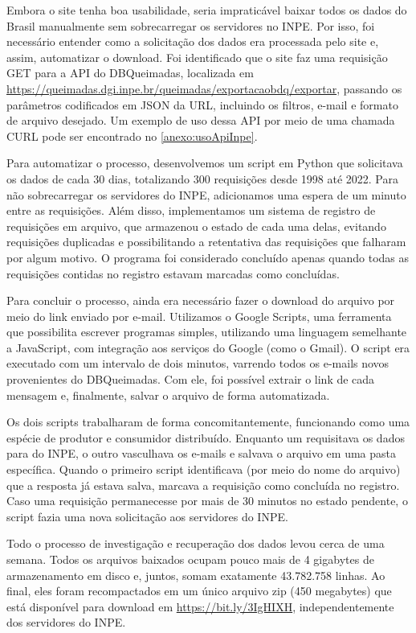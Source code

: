 \documentclass[cic,tc]{iiufrgs}
\begin{document}
Embora o site tenha boa usabilidade, seria impraticável baixar todos os dados do Brasil manualmente sem sobrecarregar os servidores no INPE. Por isso, foi necessário entender como a solicitação dos dados era processada pelo site e, assim, automatizar o download. Foi identificado que o site faz uma requisição GET para a API do DBQueimadas, localizada em \url{https://queimadas.dgi.inpe.br/queimadas/exportacaobdq/exportar}, passando os parâmetros  codificados em JSON da URL, incluindo os filtros, e-mail e formato de arquivo desejado. Um exemplo de uso dessa API por meio de uma chamada CURL pode ser encontrado no \ref{anexo:usoApiInpe}.

Para automatizar o processo, desenvolvemos um script em Python que solicitava os dados de cada 30 dias, totalizando 300 requisições desde 1998 até 2022. Para não sobrecarregar os servidores do INPE, adicionamos uma espera de um minuto entre as requisições. Além disso, implementamos um sistema de registro de requisições em arquivo, que armazenou o estado de cada uma delas, evitando requisições duplicadas e possibilitando a retentativa das requisições que falharam por algum motivo. O programa foi considerado concluído apenas quando todas as requisições contidas no registro estavam marcadas como concluídas.

Para concluir o processo, ainda era necessário fazer o download do arquivo por meio do link enviado por e-mail. Utilizamos o Google Scripts, uma ferramenta que possibilita escrever programas simples, utilizando uma linguagem semelhante a JavaScript, com integração aos serviços do Google (como o Gmail). O script era executado com um intervalo de dois minutos, varrendo todos os e-mails novos provenientes do DBQueimadas. Com ele, foi possível extrair o link de cada mensagem e, finalmente, salvar o arquivo de forma automatizada. 

Os dois scripts trabalharam de forma concomitantemente, funcionando como uma espécie de produtor e consumidor distribuído. Enquanto um requisitava os dados para do INPE, o outro vasculhava os e-mails e salvava o arquivo em uma pasta específica. Quando o primeiro script identificava (por meio do nome do arquivo) que a resposta já estava salva, marcava a requisição como concluída no registro. Caso uma requisição permanecesse por mais de 30 minutos no estado pendente, o script fazia uma nova solicitação aos servidores do INPE.

Todo o processo de investigação e recuperação dos dados levou cerca de uma semana. Todos os arquivos baixados ocupam pouco mais de 4 gigabytes de armazenamento em disco e, juntos, somam exatamente 43.782.758 linhas. Ao final, eles foram recompactados em um único arquivo zip (450 megabytes) que está disponível para download em \url{https://bit.ly/3IgHIXH}, independentemente dos servidores do INPE.
\end{document}
